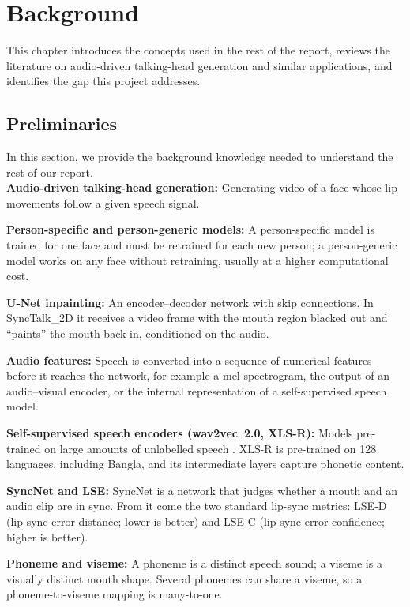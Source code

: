 \chapter{Background}
This chapter introduces the concepts used in the rest of the report, reviews the literature on audio-driven talking-head generation and similar applications, and identifies the gap this project addresses.

\section{Preliminaries}
In this section, we provide the background knowledge needed to understand the rest of our report.\\

\noindent
\textbf{Audio-driven talking-head generation:} Generating video of a face whose lip movements follow a given speech signal.

\noindent
\textbf{Person-specific and person-generic models:} A person-specific model is trained for one face and must be retrained for each new person; a person-generic model works on any face without retraining, usually at a higher computational cost.

\noindent
\textbf{U-Net inpainting:} An encoder--decoder network with skip connections. In SyncTalk\_2D it receives a video frame with the mouth region blacked out and ``paints'' the mouth back in, conditioned on the audio.

\noindent
\textbf{Audio features:} Speech is converted into a sequence of numerical features before it reaches the network, for example a mel spectrogram, the output of an audio--visual encoder, or the internal representation of a self-supervised speech model.

\noindent
\textbf{Self-supervised speech encoders (wav2vec~2.0, XLS-R):} Models pre-trained on large amounts of unlabelled speech \cite{baevski2020wav2vec2}. XLS-R \cite{babu2022xlsr} is pre-trained on 128 languages, including Bangla, and its intermediate layers capture phonetic content.

\noindent
\textbf{SyncNet and LSE:} SyncNet \cite{chung2016outoftime} is a network that judges whether a mouth and an audio clip are in sync. From it come the two standard lip-sync metrics: LSE-D (lip-sync error distance; lower is better) and LSE-C (lip-sync error confidence; higher is better).

\noindent
\textbf{Phoneme and viseme:} A phoneme is a distinct speech sound; a viseme is a visually distinct mouth shape. Several phonemes can share a viseme, so a phoneme-to-viseme mapping is many-to-one.

